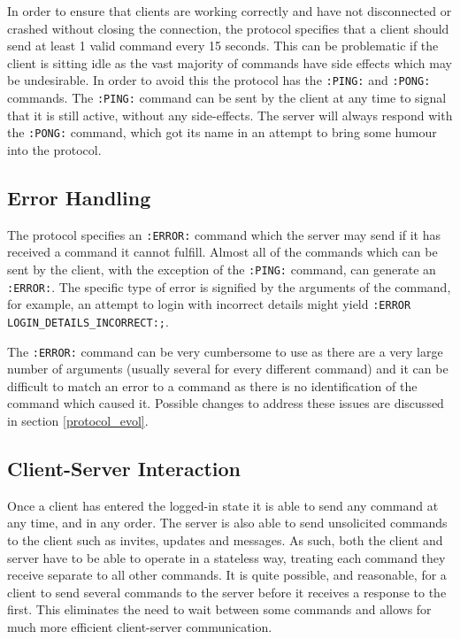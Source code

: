 In order to ensure that clients are working correctly and have not disconnected or crashed without closing the connection, the protocol specifies that a client should send at least 1 valid command every 15 seconds. This can be problematic if the client is sitting idle as the vast majority of commands have side effects which may be undesirable. In order to avoid this the protocol has the \texttt{:PING:} and \texttt{:PONG:} commands. The \texttt{:PING:} command can be sent by the client at any time to signal that it is still active, without any side-effects. The server will always respond with the \texttt{:PONG:} command, which got its name in an attempt to bring some humour into the protocol.

\subsection{Error Handling}

The protocol specifies an \texttt{:ERROR:} command which the server may send if it has received a command it cannot fulfill. Almost all of the commands which can be sent by the client, with the exception of the \texttt{:PING:} command, can generate an \texttt{:ERROR:}. The specific type of error is signified by the arguments of the command, for example, an attempt to login with incorrect details might yield \texttt{:ERROR LOGIN\_DETAILS\_INCORRECT:;}.

The \texttt{:ERROR:} command can be very cumbersome to use as there are a very large number of arguments (usually several for every different command) and it can be difficult to match an error to a command as there is no identification of the command which caused it. Possible changes to address these issues are discussed in section \ref{protocol_evol}.

\subsection{Client-Server Interaction}

Once a client has entered the logged-in state it is able to send any command at any time, and in any order. The server is also able to send unsolicited commands to the client such as invites, updates and messages. As such, both the client and server have to be able to operate in a stateless way, treating each command they receive separate to all other commands. It is quite possible, and reasonable, for a client to send several commands to the server before it receives a response to the first. This eliminates the need to wait between some commands and allows for much more efficient client-server communication.

